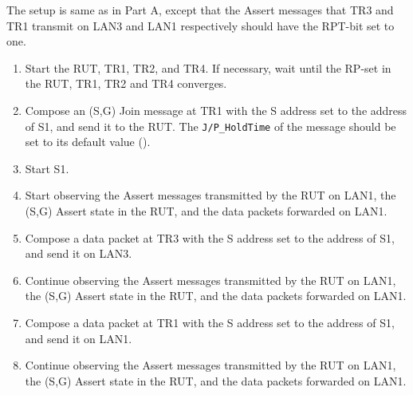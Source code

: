 \documentclass[11pt]{report}
\begin{document}

The setup is same as in Part A, except that the Assert messages that TR3 and
TR1 transmit on LAN3 and LAN1 respectively should have the RPT-bit set to one.


\begin{enumerate}

  \item Start the RUT, TR1, TR2, and TR4. If necessary, wait until the RP-set
  in the RUT, TR1, TR2 and TR4 converges.

  \item Compose an (S,G) Join message at TR1 with the S address set to the
  address of S1, and send it to the RUT.
  The \verb=J/P_HoldTime= of the message should be set to its default
  value ({\PimsmJPHoldTime}).

  \item Start S1.

  \item Start observing the Assert messages transmitted by the RUT on
  LAN1, the (S,G) Assert state in the RUT, and the data packets forwarded on
  LAN1. 

  \item Compose a data packet at TR3 with the S address set to the
  address of S1, and send it on LAN3.

  \item Continue observing the Assert messages transmitted by the RUT on
  LAN1, the (S,G) Assert state in the RUT, and the data packets forwarded on
  LAN1.

  \item Compose a data packet at TR1 with the S address set to the
  address of S1, and send it on LAN1.

  \item Continue observing the Assert messages transmitted by the RUT on
  LAN1, the (S,G) Assert state in the RUT, and the data packets forwarded on
  LAN1.

\end{enumerate}

\end{document}
